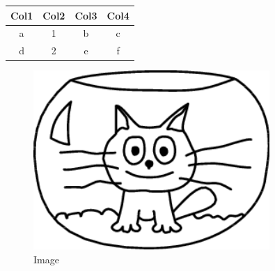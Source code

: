 \documentclass{article}
\begin{document}
\begin{tabular}{c|c|c|c}
\hline
Col1 & Col2 & Col3 & Col4 \\
\hline
a & 1 & b & c \\
\hline
d & 2 & e & f \\
\hline
\end{tabular}\begin{figure}[h!]
\centering
\includegraphics[width=0.8\textwidth]{sample_image.png}
\caption{Image}
\label{fig:image}
\end{figure}
\end{document}
